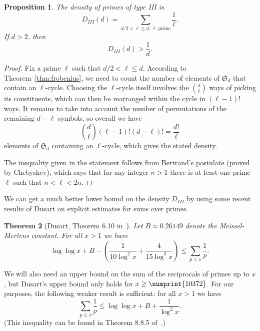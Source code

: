\documentclass[11pt]{article}
\theoremstyle{plain}
\newtheorem{theorem}{Theorem}[section]
\newtheorem{proposition}[theorem]{Proposition}
\theoremstyle{definition}
\theoremstyle{remark}
\numberwithin{equation}{section}
\renewcommand{\SS}{\mathfrak{S}}
\begin{document}
\begin{proposition}
  The density of primes of type III is
  \begin{equation*}
    D_{III}(d)=\sum_{d/2<\ell\leq d, \,\ell\text{ prime}} \frac{1}{\ell}.
  \end{equation*}
  If $d>2$, then
  \begin{equation*}
    D_{III}(d)>\frac{1}{d}.
  \end{equation*}
\end{proposition}
\begin{proof}
  Fix a prime $\ell$ such that $d/2<\ell\leq d$.  According to
  Theorem~\ref{thm:frobenius}, we need to count the number of elements of
  $\SS_d$ that contain an $\ell$-cycle.  Choosing the $\ell$-cycle itself
  involves the $\binom{d}{\ell}$ ways of picking its constituents, which can
  then be rearranged within the cycle in $(\ell-1)!$ ways.  It remains to
  take into account the number of permutations of the remaining $d-\ell$ symbols,
  so overall we have
  \begin{equation*}
    \binom{d}{\ell}(\ell-1)!(d-\ell)!=\frac{d!}{\ell}
  \end{equation*}
  elements of $\SS_d$ containing an $\ell$-cycle, which gives the stated
  density.

  The inequality given in the statement follows from Bertrand's postulate
  (proved by Chebyshev), which says that for any integer $n>1$ there is at
  least one prime $\ell$ such that $n<\ell<2n$.
\end{proof}

We can get a much better lower bound on the density $D_{III}$ by using some
recent results of Dusart on explicit estimates for sums over primes.

\begin{theorem}[Dusart, Theorem 6.10 in~\cite{Dusart}]
  Let $B\approx 0.26149$ denote the Meissel-Mertens constant.  For
  all $x>1$ we have
  \begin{equation}\label{eq:rec_lower}
    \log\log x+B-\left(\frac{1}{10\log^2 x}+\frac{4}{15\log^3 x}\right)\leq
    \sum_{p\leq x}\frac{1}{p}.
  \end{equation}
\end{theorem}

We will also need an upper bound on the sum of the reciprocals of primes up to
$x$, but Dusart's upper bound only holds for $x\geq\numprint{10372}$.  For our
purposes, the following weaker result is sufficient: for all $x>1$ we have
\begin{equation}\label{eq:rec_upper}
  \sum_{p\leq x}\frac{1}{p}\leq\log\log x + B +\frac{1}{\log^2 x}.
\end{equation}
(This inequality can be found in Theorem 8.8.5 of~\cite{BachShallit}.)
\end{document}
